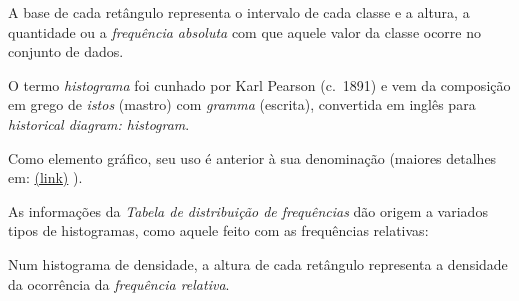 \documentclass[
]{book}
\newenvironment{Shaded}{\begin{snugshade}}{\end{snugshade}}
\newcommand{\AttributeTok}[1]{\textcolor[rgb]{0.77,0.63,0.00}{#1}}
\newcommand{\DecValTok}[1]{\textcolor[rgb]{0.00,0.00,0.81}{#1}}
\newcommand{\FloatTok}[1]{\textcolor[rgb]{0.00,0.00,0.81}{#1}}
\newcommand{\FunctionTok}[1]{\textcolor[rgb]{0.00,0.00,0.00}{#1}}
\newcommand{\NormalTok}[1]{#1}
\newcommand{\OtherTok}[1]{\textcolor[rgb]{0.56,0.35,0.01}{#1}}
\newcommand{\SpecialCharTok}[1]{\textcolor[rgb]{0.00,0.00,0.00}{#1}}
\newcommand{\StringTok}[1]{\textcolor[rgb]{0.31,0.60,0.02}{#1}}
\begin{document}
\hfill\break

A base de cada retângulo representa o intervalo de cada classe e a altura, a quantidade ou a \emph{frequência absoluta} com que aquele valor da classe ocorre no conjunto de dados.

\hfill\break

O termo \emph{histograma} foi cunhado por Karl Pearson (c.~1891) e vem da composição em grego de \emph{istos} (mastro) com \emph{gramma} (escrita), convertida em inglês para \emph{historical diagram: histogram}.

\hfill\break

Como elemento gráfico, seu uso é anterior à sua denominação (maiores detalhes em:
\href{https://www.ine.es/ss/Satellite?blobcol=urldata\&blobheader=application\%2Fpdf\&blobheadername1=Content-Disposition\&blobheadervalue1=attachment\%3B+filename\%3Dart_192_2.pdf\&blobkey=urldata\&blobtable=MungoBlobs\&blobwhere=229\%2F670\%2Fart_192_2.pdf\&ssbinary=true}{(link)} ).

\hfill\break

As informações da \emph{Tabela de distribuição de frequências} dão origem a variados tipos de histogramas, como aquele feito com as frequências relativas:

\hfill\break

Num histograma de densidade, a altura de cada retângulo representa a densidade da ocorrência da \emph{frequência relativa}.

\hfill\break

\begin{Shaded}
\end{Shaded}
\end{document}
